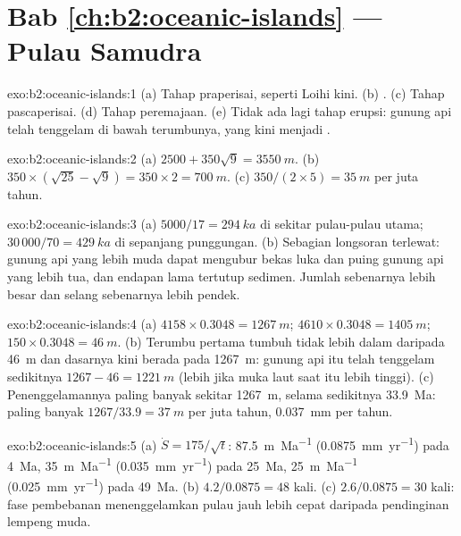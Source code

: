 \section*{Bab \ref{ch:b2:oceanic-islands} --- Pulau Samudra}

\begin{solution}{exo:b2:oceanic-islands:1}
(a) Tahap praperisai, seperti Loihi kini. (b) . (c) Tahap pascaperisai. (d) Tahap
peremajaan. (e) Tidak ada lagi tahap erupsi: gunung api telah tenggelam di bawah terumbunya, yang kini menjadi .
\end{solution}

\begin{solution}{exo:b2:oceanic-islands:2}
(a) $2500 + 350\sqrt9 = \qty{3550}{m}$. (b) $350\times(\sqrt{25} - \sqrt9) = 350\times2 =
\qty{700}{m}$. (c) $350/(2\times5) = \qty{35}{m}$ per juta tahun.
\end{solution}

\begin{solution}{exo:b2:oceanic-islands:3}
(a) $5000/17 = \qty{294}{ka}$ di sekitar pulau-pulau utama; $30\,000/70 = \qty{429}{ka}$ di sepanjang
punggungan. (b) Sebagian longsoran terlewat: gunung api yang lebih muda dapat mengubur bekas luka dan puing gunung api yang lebih tua,
dan endapan lama tertutup sedimen. Jumlah sebenarnya lebih besar dan selang sebenarnya
lebih pendek.
\end{solution}

\begin{solution}{exo:b2:oceanic-islands:4}
(a) $4158\times0.3048 = \qty{1267}{m}$; $4610\times0.3048 = \qty{1405}{m}$; $150\times0.3048 =
\qty{46}{m}$. (b) Terumbu pertama tumbuh tidak lebih dalam daripada \qty{46}{m} dan dasarnya kini berada pada
\qty{1267}{m}: gunung api itu telah tenggelam sedikitnya $1267 - 46 = \qty{1221}{m}$ (lebih jika muka laut
saat itu lebih tinggi). (c) Penenggelamannya paling banyak sekitar \qty{1267}{m}, selama sedikitnya \qty{33.9}{Ma}:
paling banyak $1267/33.9 = \qty{37}{m}$ per juta tahun, \qty{0.037}{mm} per tahun.
\end{solution}

\begin{solution}{exo:b2:oceanic-islands:5}
(a) $\dot S = 175/\sqrt t$: \qty{87.5}{m.Ma^{-1}} (\qty{0.0875}{mm.yr^{-1}}) pada \qty{4}{Ma},
\qty{35}{m.Ma^{-1}} (\qty{0.035}{mm.yr^{-1}}) pada \qty{25}{Ma}, \qty{25}{m.Ma^{-1}}
(\qty{0.025}{mm.yr^{-1}}) pada \qty{49}{Ma}. (b) $4.2/0.0875 = 48$ kali. (c) $2.6/0.0875 = 30$
kali: fase pembebanan menenggelamkan pulau jauh lebih cepat daripada pendinginan lempeng muda.
\end{solution}

